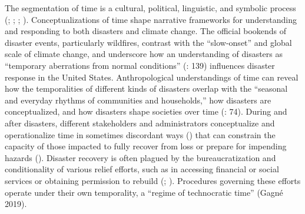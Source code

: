 \documentclass[
]{article}
\begin{document}
The segmentation of time is a cultural, political, linguistic, and symbolic process (; ; ; ). Conceptualizations of time shape narrative frameworks for understanding and responding to both disasters and climate change. The official bookends of disaster events, particularly wildfires, contrast with the ``slow-onset'' and global scale of climate change, and underscore how an understanding of disasters as ``temporary aberrations from normal conditions'' (: 139) influences disaster response in the United States. Anthropological understandings of time can reveal how the temporalities of different kinds of disasters overlap with the ``seasonal and everyday rhythms of communities and households,'' how disasters are conceptualized, and how disasters shape societies over time (: 74). During and after disasters, different stakeholders and administrators conceptualize and operationalize time in sometimes discordant ways () that can constrain the capacity of those impacted to fully recover from loss or prepare for impending hazards (). Disaster recovery is often plagued by the bureaucratization and conditionality of various relief efforts, such as in accessing financial or social services or obtaining permission to rebuild (; ). Procedures governing these efforts operate under their own temporality, a ``regime of technocratic time'' (Gagné 2019).
\end{document}
